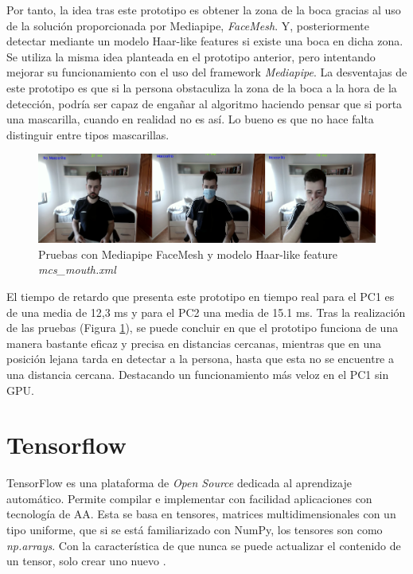 Por tanto, la idea tras este prototipo es obtener la zona de la boca gracias al uso de la solución proporcionada por Mediapipe, \textit{FaceMesh}. Y, posteriormente detectar mediante un modelo Haar-like features si existe una boca en dicha zona. Se utiliza la misma idea planteada en el prototipo anterior, pero intentando mejorar su funcionamiento con el uso del framework \textit{Mediapipe}. La desventajas de este prototipo es que si la persona obstaculiza la zona de la boca a la hora de la detección, podría ser capaz de engañar al algoritmo haciendo pensar que si porta una mascarilla, cuando en realidad no es así. Lo bueno es que no hace falta distinguir entre tipos mascarillas.

\begin{figure}[htp]
	\centering
	\includegraphics[width=17cm]{imagenes/mediapipe_prueba.png}
	\caption{Pruebas con Mediapipe FaceMesh y modelo Haar-like feature \textit{mcs\_mouth.xml}}
	\label{fig:protoMediapipe}
\end{figure}

El tiempo de retardo que presenta este prototipo en tiempo real para el PC1 es de una media de 12,3 ms y para el PC2 una media de 15.1 ms. Tras la realización de las pruebas (Figura \ref{fig:protoMediapipe}), se puede concluir en que el prototipo funciona de una manera bastante eficaz y precisa en distancias cercanas, mientras que en una posición lejana tarda en detectar a la persona, hasta que esta no se encuentre a una distancia cercana. Destacando un funcionamiento más veloz en el PC1 sin GPU.

\newpage
\section{Tensorflow}
\vspace{-1cm}
TensorFlow es una plataforma de \textit{Open Source} dedicada al aprendizaje automático. Permite compilar e implementar con facilidad aplicaciones con tecnología de AA. Esta se basa en tensores, matrices multidimensionales con un tipo uniforme, que si se está familiarizado con NumPy, los tensores son como \textit{np.arrays}. Con la característica de que nunca se puede actualizar el contenido de un tensor, solo crear uno nuevo \cite{tensorflow}.

